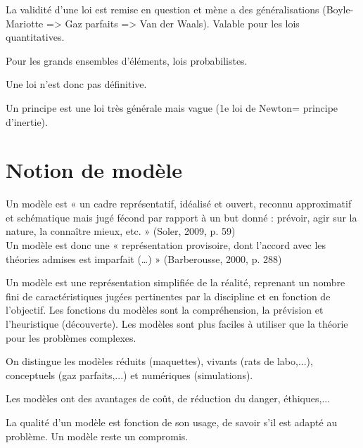 \documentclass{report}
\begin{document}
	La validité d'une loi est remise en question et mène a des généralisations (Boyle-Mariotte  => Gaz parfaits => Van der Waals). Valable pour les lois quantitatives.
	
	Pour les grands ensembles d'éléments, lois probabilistes.
	
	Une loi n'est donc pas définitive.
	
	Un principe est une loi très générale mais vague (1e loi de Newton= principe d'inertie).
	
	\section{Notion de modèle}
	
	Un modèle est « un cadre représentatif, idéalisé et ouvert, reconnu approximatif et schématique mais jugé fécond par rapport à un but donné : prévoir, agir sur la nature, la connaître mieux, etc. » (Soler, 2009, p. 59)\\
	Un modèle est donc une « représentation provisoire, dont l’accord avec les théories admises est imparfait (…) » (Barberousse, 2000, p. 288)
	
	Un modèle est une représentation simplifiée de la réalité, reprenant un nombre fini de caractéristiques jugées pertinentes par la discipline et en fonction de l'objectif. Les fonctions du modèles sont la compréhension, la prévision et l'heuristique (découverte). Les modèles sont plus faciles à utiliser que la théorie pour les problèmes complexes.
	
	On distingue les modèles réduits (maquettes), vivants (rats de labo,...), conceptuels (gaz parfaits,...) et numériques (simulations).
	
	Les modèles ont des avantages de coût, de réduction du danger, éthiques,...
	
	La qualité d'un modèle est fonction de son usage, de savoir s'il est adapté au problème. Un modèle reste un compromis.
	
	
\end{document}
